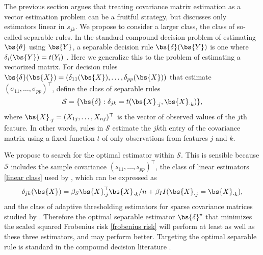 The previous section argues that treating covariance matrix estimation as a vector estimation problem can be a fruitful strategy, but discusses only estimators linear in $s_{jk}$. We propose to consider a larger class, the class of so-called separable rules. In the standard compound decision problem of estimating $\bs{\theta}$ using $\bs{Y}$, a separable decision rule $\bs{\delta}(\bs{Y})$ is one where $\delta_i(\bs{Y}) = t(Y_i)$ \citep{robbins1951asymptotically}. Here we generalize this to the problem of estimating a vectorized matrix. For decision rules $\bs{\delta}(\bs{X}) = (\delta_{11}(\bs{X}),\ldots,\delta_{pp}(\bs{X}))$ that estimate $(\sigma_{11}, \ldots, \sigma_{pp})^\top$, define the class of separable rules
\begin{equation}
  \label{separable}
  \mathcal{S} = \{\bs{\delta} : \delta_{jk} = t(\bs{X}_{\cdot j}, \bs{X}_{\cdot k})\},
\end{equation}
where $\bs{X}_{\cdot j} = (X_{1j}, \ldots, X_{nj})^\top$ is the vector of observed values of the $j$th feature. In other words, rules in $\mathcal{S}$ estimate the $jk$th entry of the covariance matrix using a fixed function $t$ of only observations from features $j$ and $k$.

We propose to search for the optimal estimator within $\mathcal{S}$. This is sensible because $\mathcal{S}$ includes the sample covariance $(s_{11}, \ldots, s_{pp})^\top$, the class of linear estimators \eqref{linear class} used by \citet{ledoit2004well}, which can be expressed as
\[
\delta_{jk}(\bs{X}) = \beta_S \bs{X}_{\cdot j}^\top \bs{X}_{\cdot k} / n + \beta_I I(\bs{X}_{\cdot j} = \bs{X}_{\cdot k}),
\]
and the class of adaptive thresholding estimators for sparse covariance matrices studied by \citet{cai2011adaptive}. Therefore the optimal separable estimator $\bs{\delta}^\star$ that minimizes the scaled squared Frobenius risk \eqref{frobenius risk} will perform at least as well as these three estimators, and may perform better. Targeting the optimal separable rule is standard in the compound decision literature \citep{zhang2003compound}.

